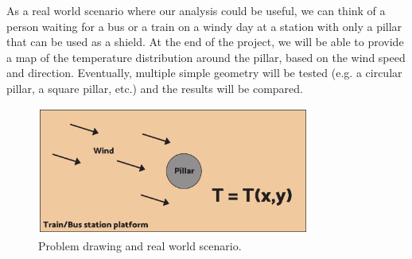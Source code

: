As a real world scenario where our analysis could be useful, we can think of a person waiting for a bus or a train on a windy day at a station with only a pillar that can be used as a shield.
At the end of the project, we will be able to provide a map of the temperature distribution around the pillar, based on the wind speed and direction.
Eventually, multiple simple geometry will be tested (e.g. a circular pillar, a square pillar, etc.) and the results will be compared.

\begin{figure}[H]
    \centering
    \includegraphics[width=0.8\textwidth]{pdf/problem_drawing}
    \caption{Problem drawing and real world scenario.}
    \label{fig:problem_drawing}
\end{figure}
